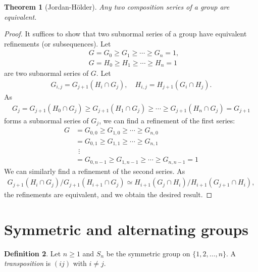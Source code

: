\documentclass[12pt]{report}
\theoremstyle{plain}
\newtheorem{theorem}{Theorem}[section]
\theoremstyle{remark}
\theoremstyle{definition}
\newtheorem{definition}[theorem]{Definition}
\begin{document}
\begin{theorem}[Jordan-H\"older]
    Any two composition series of a group are equivalent.
\end{theorem}
\begin{proof}
    It suffices to show that two subnormal series of a group have equivalent refinements (or subsequences). Let
    \begin{align*}
        &G = G_0\ge G_1\ge\cdots\ge G_n = 1, \\
        &G = H_0\ge H_1\ge\cdots\ge H_n = 1
    \end{align*}
    are two subnormal series of $G$. Let
    \begin{align*}
        G_{i,j} = G_{j+1}(H_i\cap G_j),\quad H_{i,j} = H_{j+1}(G_i\cap H_j).
    \end{align*}
    As
    \begin{align*}
        G_j = G_{j+1}(H_0\cap G_j) \ge G_{j+1}(H_1\cap G_j) \ge \cdots \ge G_{j+1}(H_n\cap G_j) = G_{j+1}
    \end{align*}
    forms a subnormal series of $G_j$, we can find a refinement of the first series:
    \begin{align*}
        G &= G_{0,0} \ge G_{1,0} \ge \cdots \ge G_{n,0} \\
        &= G_{0,1} \ge G_{1,1} \ge \cdots \ge G_{n,1} \\
        &\ \ \vdots \\
        &= G_{0,n-1} \ge G_{1,n-1} \ge \cdots \ge G_{n,n-1}=1
    \end{align*}
    We can similarly find a refinement of the second series. As
    \begin{align*}
        G_{j+1}(H_i \cap G_j) / G_{j+1}(H_{i+1}\cap G_j) \simeq H_{i+1}(G_j\cap H_i)/H_{i+1}(G_{j+1}\cap H_i),
    \end{align*}
    the refinements are equivalent, and we obtain the desired result.
\end{proof}


\clearpage
\section{Symmetric and alternating groups}

\begin{definition}
    Let $n\ge 1$ and $S_n$ be the symmetric group on $\{1,2,\dots,n\}$. A \emph{transposition} is $(ij)$ with $i\neq j$.
\end{definition}
\end{document}
